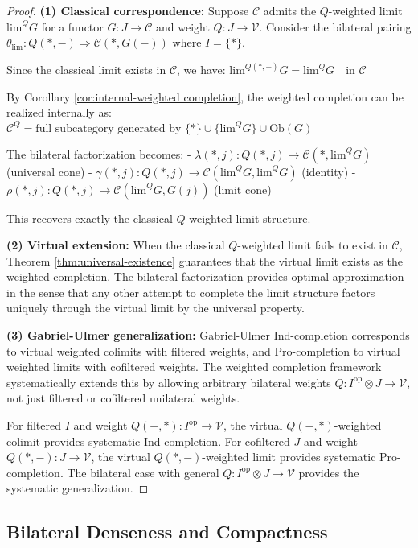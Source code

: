 \documentclass[11pt]{article}
\theoremstyle{plain}
\theoremstyle{definition}
\theoremstyle{remark}
\newcommand{\V}{\mathcal{V}}
\newcommand{\C}{\mathcal{C}}
\newcommand{\op}{\mathrm{op}}
\renewcommand{\lim}{\mathrm{lim}}
\begin{document}
\begin{proof}
\textbf{(1) Classical correspondence:} 
Suppose $\C$ admits the $Q$-weighted limit $\lim^Q G$ for a functor $G : J \to \C$ and weight $Q : J \to \V$. Consider the bilateral pairing $\theta_{\lim} : Q(\ast, -) \Rightarrow \C(\ast, G(-))$ where $I = \{\ast\}$.

Since the classical limit exists in $\C$, we have:
$\lim^{Q(\ast, -)} G = \lim^Q G \quad \text{in } \C$

By Corollary \ref{cor:internal-weighted completion}, the weighted completion can be realized internally as:
$\C^Q = \text{full subcategory generated by } \{\ast\} \cup \{\lim^Q G\} \cup \mathrm{Ob}(G)$

The bilateral factorization becomes:
- $\lambda(\ast, j) : Q(\ast, j) \to \C(\ast, \lim^Q G)$ (universal cone)
- $\gamma(\ast, j) : Q(\ast, j) \to \C(\lim^Q G, \lim^Q G)$ (identity)
- $\rho(\ast, j) : Q(\ast, j) \to \C(\lim^Q G, G(j))$ (limit cone)

This recovers exactly the classical $Q$-weighted limit structure.

\textbf{(2) Virtual extension:}
When the classical $Q$-weighted limit fails to exist in $\C$, Theorem \ref{thm:universal-existence} guarantees that the virtual limit exists as the weighted completion. The bilateral factorization provides optimal approximation in the sense that any other attempt to complete the limit structure factors uniquely through the virtual limit by the universal property.

\textbf{(3) Gabriel-Ulmer generalization:}
Gabriel-Ulmer Ind-completion corresponds to virtual weighted colimits with filtered weights, and Pro-completion to virtual weighted limits with cofiltered weights. The weighted completion framework systematically extends this by allowing arbitrary bilateral weights $Q : I^{\op} \otimes J \to \V$, not just filtered or cofiltered unilateral weights.

For filtered $I$ and weight $Q(-, \ast) : I^{\op} \to \V$, the virtual $Q(-, \ast)$-weighted colimit provides systematic Ind-completion. For cofiltered $J$ and weight $Q(\ast, -) : J \to \V$, the virtual $Q(\ast, -)$-weighted limit provides systematic Pro-completion. The bilateral case with general $Q : I^{\op} \otimes J \to \V$ provides the systematic generalization.
\end{proof}

\subsection{Bilateral Denseness and Compactness}
\end{document}
